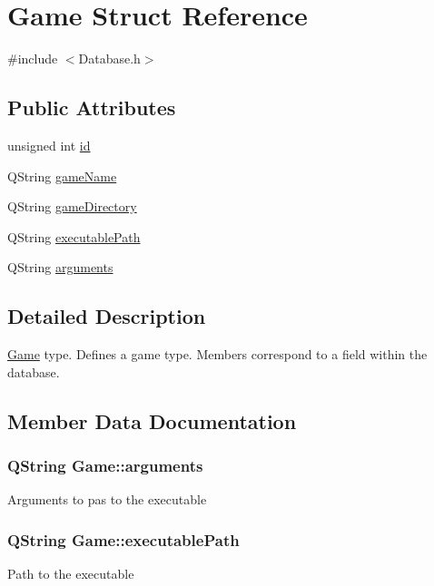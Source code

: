 \hypertarget{struct_game}{}\section{Game Struct Reference}
\label{struct_game}


{\ttfamily \#include $<$Database.\+h$>$}

\subsection*{Public Attributes}
\begin{DoxyCompactItemize}
\item 
unsigned int \hyperlink{struct_game_a437d78e3b0cc483fd0be0af651695d3d}{id}
\item 
Q\+String \hyperlink{struct_game_a2dc75f118e0b9b79715efb8fa7881dc2}{game\+Name}
\item 
Q\+String \hyperlink{struct_game_a5a544cd9e4694e43fdf3fff9fd7417b3}{game\+Directory}
\item 
Q\+String \hyperlink{struct_game_ad870943c9fa3d53f175fdf92f5a9881b}{executable\+Path}
\item 
Q\+String \hyperlink{struct_game_a7e9bf74354a4a9baa6bb9cc370e7ed7b}{arguments}
\end{DoxyCompactItemize}


\subsection{Detailed Description}
\hyperlink{struct_game}{Game} type. Defines a game type. Members correspond to a field within the database. 

\subsection{Member Data Documentation}
\hypertarget{struct_game_a7e9bf74354a4a9baa6bb9cc370e7ed7b}{}
\subsubsection[{arguments}]{\setlength{\rightskip}{0pt plus 5cm}Q\+String Game\+::arguments}\label{struct_game_a7e9bf74354a4a9baa6bb9cc370e7ed7b}
Arguments to pas to the executable \hypertarget{struct_game_ad870943c9fa3d53f175fdf92f5a9881b}{}
\subsubsection[{executable\+Path}]{\setlength{\rightskip}{0pt plus 5cm}Q\+String Game\+::executable\+Path}\label{struct_game_ad870943c9fa3d53f175fdf92f5a9881b}
Path to the executable \hypertarget{struct_game_a5a544cd9e4694e43fdf3fff9fd7417b3}{}
